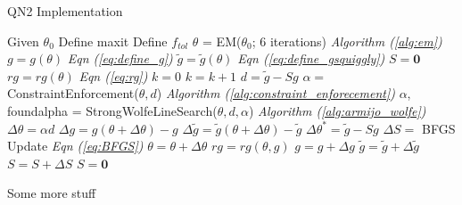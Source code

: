 \documentclass[letter,12pt]{article}
\begin{document}
\begin{algorithm} 
\caption{QN2 Implementation}
\label{alg:qn2}
\begin{algorithmic}[1]
\State Given $\theta_0$
\State Define maxit
\State Define $f_{tol}$
\State $\theta$ = EM($\theta_0$; $6$ iterations)
\indent \indent  \indent\indent \indent \indent \indent \indent  \textit{Algorithm (\ref{alg:em})}
\State $g = g(\theta)$
\indent \indent \indent \indent \indent \indent\indent \indent \indent \indent \indent \space \space \space \textit{Eqn (\ref{eq:define_g})}
\State $\tilde{g} = \tilde{g}(\theta)$
\indent \indent \indent \indent \indent \indent\indent \indent \indent \indent \indent \space \space \space \textit{Eqn (\ref{eq:define_gsquiggly})}
\State $S = \boldsymbol{0}$
\State $rg = rg(\theta)$
\indent \indent \indent \indent \indent \indent\indent \indent \indent \indent \indent  \textit{Eqn (\ref{eq:rg})}
\State $k = 0$
\State $k = k + 1$
\State $d = \tilde{g} - Sg$
\State $\alpha = $ ConstraintEnforcement($\theta,d$) 
\indent \indent \indent \indent \indent \space \space \textit{Algorithm (\ref{alg:constraint_enforecement})}
\State $\alpha$, foundalpha = StrongWolfeLineSearch($\theta,d,\alpha$) 
\indent \indent \textit{Algorithm (\ref{alg:armijo_wolfe})}
\State $\Delta\theta = \alpha d$
\State $\Delta g = g(\theta+\Delta\theta) - g$
\State $\Delta \tilde{g} = \tilde{g}(\theta + \Delta\theta) - \tilde{g}$
\State $\Delta \theta^* = \tilde{g} - Sg$
\State $\Delta S = $ BFGS Update 
\indent \indent \indent \indent \indent \indent \indent \space \space \textit{Eqn (\ref{eq:BFGS})}
\State $\theta = \theta + \Delta\theta$
\State $rg = rg(\theta,g)$
\State $g = g+\Delta g$
\State $\tilde{g} = \tilde{g}+\Delta \tilde{g}$
\State $S = S +\Delta S$
\Else
\State $S = \boldsymbol{0}$
\EndIf
\EndWhile
\end{algorithmic}
\end{algorithm}


Some more stuff

\pagebreak


\end{document}

